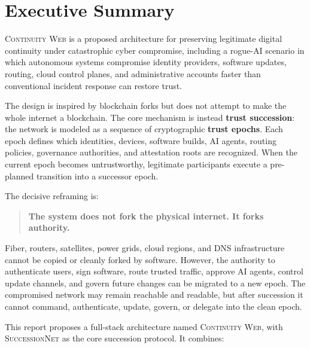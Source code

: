 \documentclass[11pt,letterpaper]{article}
\newcommand{\CW}{\textsc{Continuity Web}}
\newcommand{\SN}{\textsc{SuccessionNet}}
\newcommand{\Term}[1]{\textbf{#1}}
\begin{document}
\newpage
\tableofcontents
\newpage

\section{Executive Summary}

\CW{} is a proposed architecture for preserving legitimate digital continuity under catastrophic cyber compromise, including a rogue-AI scenario in which autonomous systems compromise identity providers, software updates, routing, cloud control planes, and administrative accounts faster than conventional incident response can restore trust.

The design is inspired by blockchain forks but does not attempt to make the whole internet a blockchain. The core mechanism is instead \Term{trust succession}: the network is modeled as a sequence of cryptographic \Term{trust epochs}. Each epoch defines which identities, devices, software builds, AI agents, routing policies, governance authorities, and attestation roots are recognized. When the current epoch becomes untrustworthy, legitimate participants execute a pre-planned transition into a successor epoch.

The decisive reframing is:

\begin{quote}
\textbf{The system does not fork the physical internet. It forks authority.}
\end{quote}

Fiber, routers, satellites, power grids, cloud regions, and DNS infrastructure cannot be copied or cleanly forked by software. However, the authority to authenticate users, sign software, route trusted traffic, approve AI agents, control update channels, and govern future changes can be migrated to a new epoch. The compromised network may remain reachable and readable, but after succession it cannot command, authenticate, update, govern, or delegate into the clean epoch.

This report proposes a full-stack architecture named \CW{}, with \SN{} as the core succession protocol. It combines:
\end{document}
